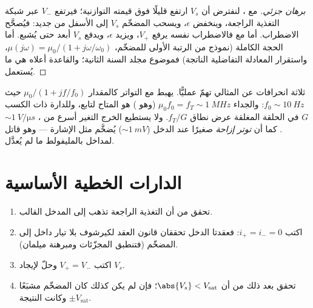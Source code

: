 \begin{proof}[برهان جزئي]
مع ، لنفترض أن $V_s$ ارتفع قليلًا فوق قيمته
التوازنية؛ فيرتفع $V_-$ عبر شبكة التغذية الراجعة، وينخفض $\epsilon$،
ويسحب المضخّم $V_s$ إلى الأسفل من جديد: فيُصحَّح الاضطراب.
أما مع  فالاضطراب نفسه يرفع $V_+$،
ويزيد $\epsilon$، ويدفع $V_s$ أبعد حتى يُشبع.
أما الحجة الكاملة (نموذج من الرتبة الأولى للمضخّم، $\mu(j\omega)
= \mu_0/(1 + j\omega/\omega_0)$، واستقرار المعادلة التفاضلية
الناتجة) فموضوع مجلد السنة الثانية؛ والقاعدة
أعلاه هي ما يُستعمل.
\end{proof}

\begin{remark}\label{rem:b1:operational-amplifier:real}
ثلاثة انحرافات عن المثالي تهمّ عمليًّا. 
يهبط مع التواتر كالمقدار $\mu_0/(1 + jf/f_0)$ حيث $f_0 \sim \qty{10}{Hz}$:
والجداء $\mu_0 f_0 = f_T \sim \qty{1}{MHz}$ (وهو \emph{}) هو  المتاح لتابع، وللدارة ذات
الكسب $G$ في الحلقة المغلقة عرض نطاق $f_T/G$. ولا يستطيع الخرج التغير
أسرع من \emph{}، $\sim\qty{1}{V/\micro s}$. كما أن
\emph{توتر إزاحة} صغيرًا عند الدخل ($\sim\qty{1}{mV}$) يُضخَّم مثل
الإشارة --- وهو قاتل لمداخل بالمليفولط ما لم يُعدَّل.
\end{remark}

\section{الدارات الخطية الأساسية}

\begin{method}\label{met:b1:operational-amplifier:method}
\begin{enumerate}
  \item تحقق من أن التغذية الراجعة تذهب إلى المدخل القالب.
  \item اكتب $i_+ = i_- = 0$: فعقدتا الدخل تحققان قانون
        العقد لكيرشوف بلا تيار داخل إلى المضخّم (فتنطبق المجزّئات ومبرهنة
        ميلمان).
  \item اكتب $V_+ = V_-$ وحلّ لإيجاد $V_s$.
  \item تحقق بعد ذلك من أن $\abs{V_s} < V_{\mathrm{sat}}$؛ فإن لم يكن كذلك
        كان المضخّم مشبَعًا وكانت النتيجة $\pm V_{\mathrm{sat}}$.
\end{enumerate}
\end{method}

